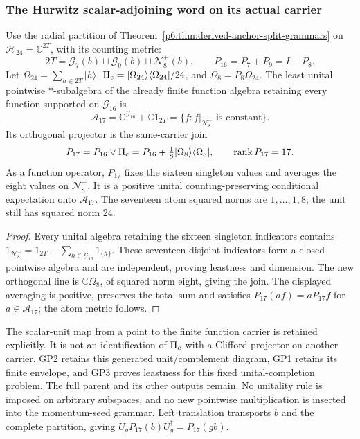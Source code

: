 \documentclass[12pt,a4paper]{article}
\begin{document}
\subsubsection{The Hurwitz scalar-adjoining word on its actual carrier}
\label{p6:sec:v179-hurwitz-unital-response}

\begin{theorem}
\label{p6:thm:v179-hurwitz-unital-completion}
Use the radial partition of
Theorem~\ref{p6:thm:derived-anchor-split-grammars} on
\(\mathcal H_{24}=\mathbb C^{2T}\), with its counting metric:
\[
 2T=\mathcal G_7(b)\sqcup\mathcal G_9(b)\sqcup\mathcal N_8^+(b),
 \qquad P_{16}=P_7+P_9=I-P_8.
\]
Let \(\Omega_{24}=\sum_{h\in2T}|h\rangle\),
\(\Pi_{\rm c}=|\Omega_{24}\rangle\langle\Omega_{24}|/24\), and
\(\Omega_8=P_8\Omega_{24}\).  The least unital pointwise
\(*\)-subalgebra of the already finite function algebra retaining every
function supported on \(\mathcal G_{16}\) is
\[
 \mathcal A_{17}
 =\mathbb C^{\mathcal G_{16}}+\mathbb C1_{2T}
 =\{f:f|_{\mathcal N_8^+}\text{ is constant}\}.
\]
Its orthogonal projector is the same-carrier join
\begin{equation}
\label{p6:eq:v179-hurwitz-unital-join}
 P_{17}=P_{16}\vee\Pi_{\rm c}
       =P_{16}+\tfrac18|\Omega_8\rangle\langle\Omega_8|,
 \qquad \operatorname{rank}P_{17}=17.
\end{equation}
As a function operator, \(P_{17}\) fixes the sixteen singleton values and
averages the eight values on \(\mathcal N_8^+\).  It is a positive unital
counting-preserving conditional expectation onto \(\mathcal A_{17}\).
The seventeen atom squared norms are \(1,\ldots,1,8\); the unit still has
squared norm \(24\).
\end{theorem}
\begin{proof}
Every unital algebra retaining the sixteen singleton indicators contains
\(1_{\mathcal N_8^+}=1_{2T}-\sum_{h\in\mathcal G_{16}}1_{\{h\}}\).
These seventeen disjoint indicators form a closed pointwise algebra and
are independent, proving leastness and dimension.  The new orthogonal
line is \(\mathbb C\Omega_8\), of squared norm eight, giving the join.
The displayed averaging is positive, preserves the total sum and satisfies
\(P_{17}(af)=aP_{17}f\) for \(a\in\mathcal A_{17}\); the atom metric follows.
\end{proof}

The scalar-unit map from a point to the finite function carrier is retained
explicitly.  It is not an identification of \(\Pi_{\rm c}\) with a Clifford
projector on another carrier.  GP2 retains this generated unit/complement
diagram, GP1 retains its finite envelope, and GP3 proves leastness for this
fixed unital-completion problem.  The full parent and its other outputs
remain.  No unitality rule is imposed on arbitrary subspaces, and no new
pointwise multiplication is inserted into the momentum-seed grammar.
Left translation transports \(b\) and the complete partition, giving
\(U_gP_{17}(b)U_g^\dagger=P_{17}(gb)\).
\end{document}
